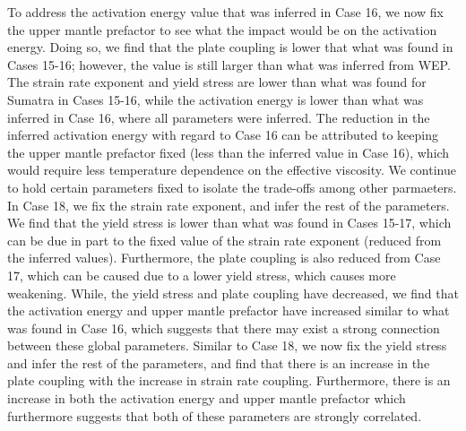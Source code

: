 \documentclass[12pt]{article}
\begin{document}
{To address the activation energy value that was inferred in Case 16, we now fix the upper mantle prefactor to see what the impact would be on the activation energy. Doing so, we find that the plate coupling is lower that what was found in Cases 15-16; however, the value is still larger than what was inferred from WEP. The strain rate exponent and yield stress are lower than what was found for Sumatra in Cases 15-16, while the activation energy is lower than what was inferred in Case 16, where all parameters were inferred. The reduction in the inferred activation energy with regard to Case 16 can be attributed to keeping the upper mantle prefactor fixed (less than the inferred value in Case 16), which would require less temperature dependence on the effective viscosity. We continue to hold certain parameters fixed to isolate the trade-offs among other parmaeters. In Case 18, we fix the strain rate exponent, and infer the rest of the parameters. We find that the yield stress is lower than what was found in Cases 15-17, which can be due in part to the fixed value of the strain rate exponent (reduced from the inferred values). Furthermore, the plate coupling is also reduced from Case 17, which can be caused due to a lower yield stress, which causes more weakening. While, the yield stress and plate coupling have decreased, we find that the activation energy and upper mantle prefactor have increased similar to what was found in Case 16, which suggests that there may exist a strong connection between these global parameters. Similar to Case 18, we now fix the yield stress and infer the rest of the parameters, and find that there is an increase in the plate coupling with the increase in strain rate coupling. Furthermore, there is an increase in both the activation energy and upper mantle prefactor which furthermore suggests that both of these parameters are strongly correlated.  




}
\end{document}
